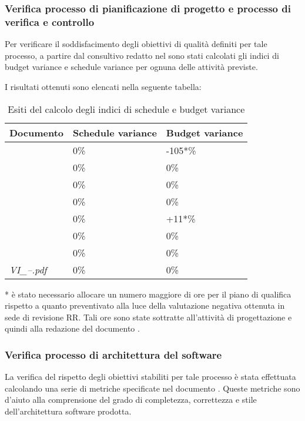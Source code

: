 		\subsubsection{Verifica processo di pianificazione di progetto e processo di verifica e controllo}
		Per verificare il soddisfacimento degli obiettivi di qualità definiti per tale processo, a partire dal consultivo redatto nel \PdP{} sono stati calcolati gli indici di budget variance e schedule variance per ognuna delle attività previste.
		
		I risultati ottenuti sono elencati nella seguente tabella:	
		\begin{table}[H]
		\begin{tabular}{|l|l|l|}
		\hline
		\textbf{Documento} 		&\textbf{Schedule variance} &\textbf{Budget variance} 		\\
		\hline
		\PdQ 					&0\%		&-105*\%\\
		\NdP 					&0\%		&0\%\\
		\AdR 					&0\%		&0\%\\
		\PdP 					&0\%		&0\%\\
		\ST						&0\%		&+11*\%\\
		\DP						&0\%		&0\%\\
		\Glossario 				&0\%		&0\%\\
		\textit{VI_--.pdf} 		&0\%		&0\%\\
		\hline
		\end{tabular}
		\caption{Esiti del calcolo degli indici di schedule e budget variance}
		\end{table}
		* è stato necessario allocare un numero maggiore di ore per il piano di qualifica rispetto a quanto preventivato alla luce della valutazione negativa ottenuta in sede di revisione RR. Tali ore sono state sottratte all'attività di progettazione e quindi alla redazione del documento \ST.
		
		\subsubsection{Verifica processo di architettura del software}
		La verifica del rispetto degli obiettivi stabiliti per tale processo è stata effettuata calcolando una serie di metriche specificate nel documento \NdP. Queste metriche sono d'aiuto alla comprensione del grado di completezza, correttezza e stile dell'architettura software prodotta.
		
